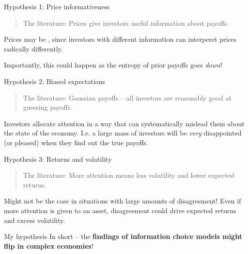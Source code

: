 \documentclass[
  ignorenonframetext,
]{beamer}
\begin{document}
\begin{frame}{Hypothesis 1: Price informativeness}
\protect\hypertarget{hypothesis-1-price-informativeness}{}
\begin{quote}
The literature: Prices give investors useful information about payoffs.
\end{quote}

Prices may be , since investors with
different information can interperet prices radically differently.

Importantly, this could happen as the entropy of prior payoffs goes
\emph{down}!
\end{frame}

\begin{frame}{Hypothesis 2: Biased expectations}
\protect\hypertarget{hypothesis-2-biased-expectations}{}
\begin{quote}
The literature: Gaussian payoffs -- all investors are reasonably good at
guessing payoffs.
\end{quote}

Investors allocate attention in a way that can systematically mislead
them about the state of the economy. I.e. a large mass of investors will
be \emph{very} disappointed (or pleased) when they find out the true
payoffs.
\end{frame}

\begin{frame}{Hypothesis 3: Returns and volatility}
\protect\hypertarget{hypothesis-3-returns-and-volatility}{}
\begin{quote}
The literature: More attention means less volatility and lower expected
returns.
\end{quote}

Might not be the case in situations with large amounts of disagreement!
Even if more attention is given to an asset, disagreement could drive
 expected returns and excess volatility.
\end{frame}

\begin{frame}{My hypothesis}
\protect\hypertarget{my-hypothesis-1}{}
In short -- the \textbf{findings of information choice models might flip
in complex economies}!
\end{frame}
\end{document}
